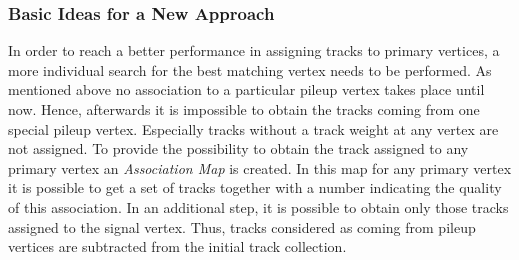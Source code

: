 \subsubsection{Basic Ideas for a New Approach}

In order to reach a better performance in assigning tracks to primary vertices, a more individual search for the best matching vertex needs to be performed. As mentioned above no association to a particular pileup vertex takes place until now. Hence, afterwards it is impossible to obtain the tracks coming from one special pileup vertex. Especially tracks without a track weight at any vertex are not assigned. To provide the possibility to obtain the track assigned to any primary vertex an \textit{Association Map} is created. In this map for any primary vertex it is possible to get a set of tracks together with a number indicating the quality of this association. In an additional step, it is possible to obtain only those tracks assigned to the signal vertex. Thus, tracks considered as coming from pileup vertices are subtracted from the initial track collection.

